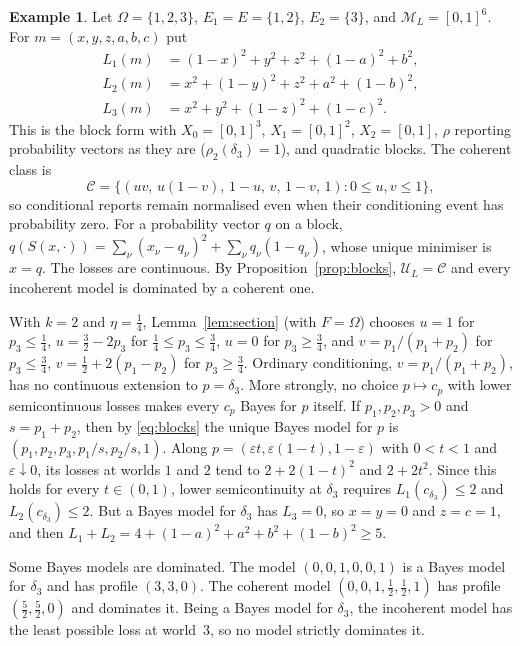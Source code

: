 \documentclass[11pt]{article}
\theoremstyle{definition}
\newtheorem{example}[theorem]{Example}
\theoremstyle{remark}
\newcommand{\M}{\mathcal M}
\newcommand{\C}{\mathcal C}
\newcommand{\U}{\mathcal U}
\begin{document}
\begin{example}\label{ex:conditional}
Let $\Omega=\{1,2,3\}$, $E_1=E=\{1,2\}$, $E_2=\{3\}$, and $\M_L=[0,1]^6$. For $m=(x,y,z,a,b,c)$ put
\[
\begin{aligned}
 L_1(m)&=(1-x)^2+y^2+z^2+(1-a)^2+b^2,\\
 L_2(m)&=x^2+(1-y)^2+z^2+a^2+(1-b)^2,\\
 L_3(m)&=x^2+y^2+(1-z)^2+(1-c)^2.
\end{aligned}
\]
This is the block form with $X_0=[0,1]^3$, $X_1=[0,1]^2$, $X_2=[0,1]$, $\rho$ reporting probability vectors as they are ($\rho_2(\delta_3)=1$), and quadratic blocks. The coherent class is
\[
 \C=\{(uv,\,u(1-v),\,1-u,\,v,\,1-v,\,1):0\le u,v\le1\},
\]
so conditional reports remain normalised even when their conditioning event has probability zero. For a probability vector $q$ on a block, $q(S(x,\cdot))=\sum_\nu(x_\nu-q_\nu)^2+\sum_\nu q_\nu(1-q_\nu)$, whose unique minimiser is $x=q$. The losses are continuous. By Proposition~\ref{prop:blocks}, $\U_L=\C$ and every incoherent model is dominated by a coherent one.

With $k=2$ and $\eta=\tfrac14$, Lemma~\ref{lem:section} (with $F=\Omega$) chooses $u=1$ for $p_3\le\tfrac14$, $u=\tfrac32-2p_3$ for $\tfrac14\le p_3\le\tfrac34$, $u=0$ for $p_3\ge\tfrac34$, and $v=p_1/(p_1+p_2)$ for $p_3\le\tfrac34$, $v=\tfrac12+2(p_1-p_2)$ for $p_3\ge\tfrac34$. Ordinary conditioning, $v=p_1/(p_1+p_2)$, has no continuous extension to $p=\delta_3$. More strongly, no choice $p\mapsto c_p$ with lower semicontinuous losses makes every $c_p$ Bayes for $p$ itself. If $p_1,p_2,p_3>0$ and $s=p_1+p_2$, then by \eqref{eq:blocks} the unique Bayes model for $p$ is $(p_1,p_2,p_3,p_1/s,p_2/s,1)$. Along $p=(\varepsilon t,\varepsilon(1-t),1-\varepsilon)$ with $0<t<1$ and $\varepsilon\downarrow0$, its losses at worlds $1$ and $2$ tend to $2+2(1-t)^2$ and $2+2t^2$. Since this holds for every $t\in(0,1)$, lower semicontinuity at $\delta_3$ requires $L_1(c_{\delta_3})\le2$ and $L_2(c_{\delta_3})\le2$. But a Bayes model for $\delta_3$ has $L_3=0$, so $x=y=0$ and $z=c=1$, and then $L_1+L_2=4+(1-a)^2+a^2+b^2+(1-b)^2\ge5$.

Some Bayes models are dominated. The model $(0,0,1,0,0,1)$ is a Bayes model for $\delta_3$ and has profile $(3,3,0)$. The coherent model $(0,0,1,\tfrac12,\tfrac12,1)$ has profile $(\tfrac52,\tfrac52,0)$ and dominates it. Being a Bayes model for $\delta_3$, the incoherent model has the least possible loss at world~$3$, so no model strictly dominates it.
\end{example}
\end{document}
